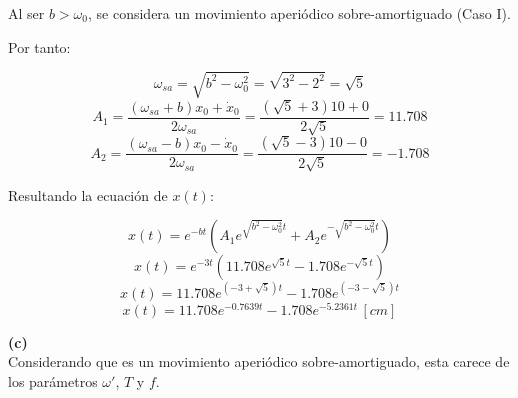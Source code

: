 \documentclass[letter,11pt]{article}
\begin{document}
Al ser $b > \omega_0$, se considera un movimiento aperiódico sobre-amortiguado
(Caso I).

Por tanto:

\begin{equation*}
    \omega_{sa} = \sqrt{b^2-\omega^2_0} = \sqrt{3^2-2^2} = \sqrt{5}
\end{equation*}
\begin{equation*}
    A_1 = \dfrac{(\omega_{sa} + b) x_0 + \dot{x}_0}{2\omega_{sa}} = \frac{(\sqrt{5} + 3) 10 + 0}{2\sqrt{5}} = 11.708
\end{equation*}
\begin{equation*}
    A_2 = \dfrac{(\omega_{sa} - b) x_0 - \dot{x}_0}{2\omega_{sa}} = \frac{(\sqrt{5} - 3) 10 - 0}{2\sqrt{5}} = -1.708
\end{equation*}

Resultando la ecuación de $x(t)$:

\begin{equation*}
    x(t) = e^{-bt} \left( A_1 e^{\sqrt{b^2-\omega^2_0}t} + A_2 e^{-\sqrt{b^2-\omega^2_0}t} \right)
\end{equation*}
\begin{equation*}
    x(t) = e^{-3t} \left( 11.708 e^{\sqrt{5}t} - 1.708 e^{-\sqrt{5}t} \right)
\end{equation*}
\begin{equation*}
    x(t) = 11.708 e^{(-3 + \sqrt{5})t} - 1.708 e^{(-3 -\sqrt{5})t}
\end{equation*}
\begin{equation}
    x(t) = 11.708 e^{-0.7639t} - 1.708 e^{-5.2361t}\,[cm]
\end{equation}

\textbf{(c)} \\

Considerando que es un movimiento aperiódico sobre-amortiguado, esta carece de
los parámetros $\omega'$, $T$ y $f$.
\end{document}
